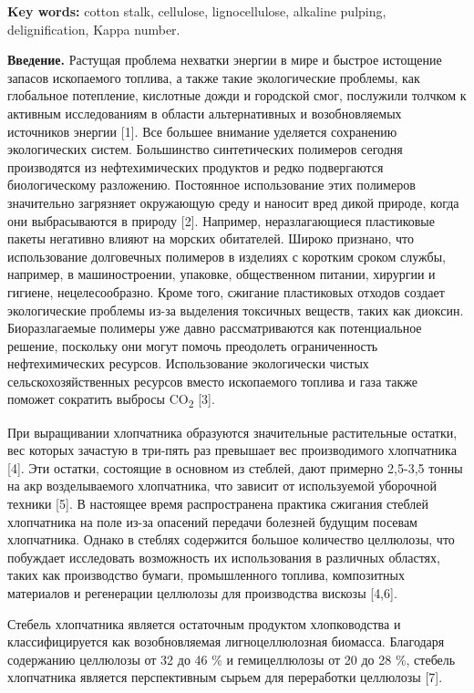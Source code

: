 {\bfseries Key words:} cotton stalk, cellulose, lignocellulose, alkaline
pulping, delignification, Kappa number.

\begin{multicols}{2}
{\bfseries Введение.} Растущая проблема нехватки энергии в мире и быстрое
истощение запасов ископаемого топлива, а также такие экологические
проблемы, как глобальное потепление, кислотные дожди и городской смог,
послужили толчком к активным исследованиям в области альтернативных и
возобновляемых источников энергии {[}1{]}. Все большее внимание
уделяется сохранению экологических систем. Большинство синтетических
полимеров сегодня производятся из нефтехимических продуктов и редко
подвергаются биологическому разложению. Постоянное использование этих
полимеров значительно загрязняет окружающую среду и наносит вред дикой
природе, когда они выбрасываются в природу {[}2{]}. Например,
неразлагающиеся пластиковые пакеты негативно влияют на морских
обитателей. Широко признано, что использование долговечных полимеров в
изделиях с коротким сроком службы, например, в машиностроении, упаковке,
общественном питании, хирургии и гигиене, нецелесообразно. Кроме того,
сжигание пластиковых отходов создает экологические проблемы из-за
выделения токсичных веществ, таких как диоксин. Биоразлагаемые полимеры
уже давно рассматриваются как потенциальное решение, поскольку они могут
помочь преодолеть ограниченность нефтехимических ресурсов. Использование
экологически чистых сельскохозяйственных ресурсов вместо ископаемого
топлива и газа также поможет сократить выбросы CO\textsubscript{2}
{[}3{]}.

При выращивании хлопчатника образуются значительные растительные
остатки, вес которых зачастую в три-пять раз превышает вес производимого
хлопчатника {[}4{]}. Эти остатки, состоящие в основном из стеблей, дают
примерно 2,5-3,5 тонны на акр возделываемого хлопчатника, что зависит от
используемой уборочной техники {[}5{]}. В настоящее время распространена
практика сжигания стеблей хлопчатника на поле из-за опасений передачи
болезней будущим посевам хлопчатника. Однако в стеблях содержится
большое количество целлюлозы, что побуждает исследовать возможность их
использования в различных областях, таких как производство бумаги,
промышленного топлива, композитных материалов и регенерации целлюлозы
для производства вискозы {[}4,6{]}.

Стебель хлопчатника является остаточным продуктом хлопководства и
классифицируется как возобновляемая лигноцеллюлозная биомасса. Благодаря
содержанию целлюлозы от 32 до 46 \% и гемицеллюлозы от 20 до 28 \%,
стебель хлопчатника является перспективным сырьем для переработки
целлюлозы {[}7{]}.


\end{multicols}

